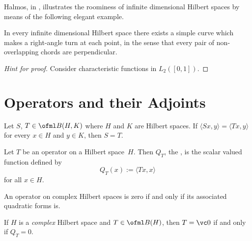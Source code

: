 Halmos, in \cite{Halmos:1982}, illustrates the roominess of infinite dimensional Hilbert spaces by means of the
following elegant example.

\begin{exam} In every infinite dimensional Hilbert space there exists a simple curve which makes a right-angle
turn at each point, in the sense that every pair of non-overlapping chords are perpendicular.
\end{exam}

\begin{proof}[\emph{Hint for proof}]  Consider characteristic functions in $L_2([0,1])$.  \ns
\end{proof}
























\section{Operators and their Adjoints}

\begin{prop}\label{C0635103} Let $S$, $T \in \ofml B(H,K)$ where $H$ and $K$ are Hilbert
spaces. If $\langle Sx,y \rangle = \langle Tx,y \rangle$ for every $x \in H$ and $y \in
K$, then $S = T$.
\end{prop}

\begin{defn} Let $T$ be an operator on a Hilbert space~$H$.  Then $Q_T$, the
, is the scalar valued function defined by
   \[ Q_T(x) := \langle Tx,x \rangle \]
for all $x \in H$.
\end{defn}

An operator on complex Hilbert spaces is zero if and only if its associated quadratic forms is.

\begin{prop}\label{C0635105} If $H$ is a \emph{complex} Hilbert space and $T \in \ofml B(H)$, then
$T = \vc 0$ if and only if $Q_T = 0$.
\end{prop}

